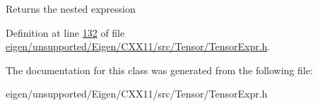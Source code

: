 \begin{DoxyReturn}{Returns}
the nested expression 
\end{DoxyReturn}


Definition at line \hyperlink{eigen_2unsupported_2_eigen_2_c_x_x11_2src_2_tensor_2_tensor_expr_8h_source_l00132}{132} of file \hyperlink{eigen_2unsupported_2_eigen_2_c_x_x11_2src_2_tensor_2_tensor_expr_8h_source}{eigen/unsupported/\+Eigen/\+C\+X\+X11/src/\+Tensor/\+Tensor\+Expr.\+h}.



The documentation for this class was generated from the following file\+:\begin{DoxyCompactItemize}
\item 
eigen/unsupported/\+Eigen/\+C\+X\+X11/src/\+Tensor/\+Tensor\+Expr.\+h\end{DoxyCompactItemize}

